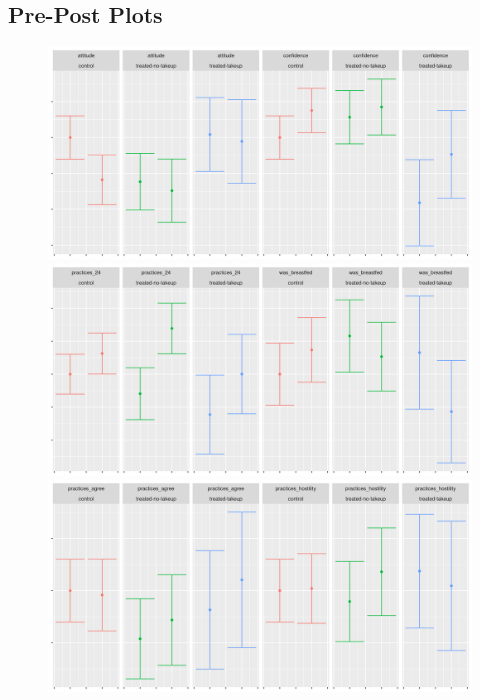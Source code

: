\documentclass{article}
\begin{document}
\clearpage

\subsection*{Pre-Post Plots}

\begin{figure}

\includegraphics[width=\textwidth]{plots/pre_post/confidence.png}
\includegraphics[width=\textwidth]{plots/pre_post/was_breastfed.png}
\includegraphics[width=\textwidth]{plots/pre_post/practices_agree.png}
\label{fig:Pre Post Plots}
\end{figure}
\end{document}
